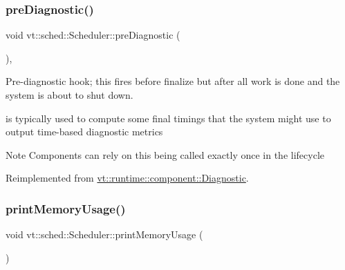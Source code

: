 \mbox{\label{structvt_1_1sched_1_1_scheduler_a42835a58f541dd65cecd4d393fe78a81}} 
\subsubsection{\texorpdfstring{pre\+Diagnostic()}{preDiagnostic()}}
{\footnotesize\ttfamily void vt\+::sched\+::\+Scheduler\+::pre\+Diagnostic (\begin{DoxyParamCaption}{ }\end{DoxyParamCaption})\hspace{0.3cm}{\ttfamily [override]}, {\ttfamily [virtual]}}



Pre-\/diagnostic hook; this fires before finalize but after all work is done and the system is about to shut down. 

is typically used to compute some final timings that the system might use to output time-\/based diagnostic metrics

\begin{DoxyNote}{Note}
Components can rely on this being called exactly once in the lifecycle 
\end{DoxyNote}


Reimplemented from \hyperlink{structvt_1_1runtime_1_1component_1_1_diagnostic_a4e64b5a12ffc1874065aa8b09e6309a9}{vt\+::runtime\+::component\+::\+Diagnostic}.

\mbox{\label{structvt_1_1sched_1_1_scheduler_a48a6fdb0c7384df09b467c0e68ca8e6f}} 
\subsubsection{\texorpdfstring{print\+Memory\+Usage()}{printMemoryUsage()}}
{\footnotesize\ttfamily void vt\+::sched\+::\+Scheduler\+::print\+Memory\+Usage (\begin{DoxyParamCaption}{ }\end{DoxyParamCaption})}



